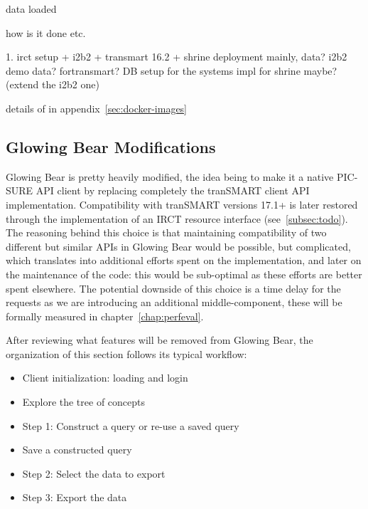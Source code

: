 data loaded

how is it done etc.

1. irct setup + i2b2 + transmart 16.2 + shrine
deployment mainly, data? i2b2 demo data? fortransmart? 
DB setup for the systems
impl for shrine maybe? (extend the i2b2 one)

details of in appendix~\ref{sec:docker-images}


\subsection{Glowing Bear Modifications}

Glowing Bear is pretty heavily modified, the idea being to make it a native PIC-SURE API client by replacing completely the tranSMART client API implementation. 
Compatibility with tranSMART versions 17.1+ is later restored through the implementation of an IRCT resource interface (see~\ref{subsec:todo}).
The reasoning behind this choice is that maintaining compatibility of two different but similar APIs in Glowing Bear would be possible, but complicated, which translates into additional efforts spent on the implementation, and later on the maintenance of the code: this would be sub-optimal as these efforts are better spent elsewhere.
The potential downside of this choice is a time delay for the requests as we are introducing an additional middle-component, these will be formally measured in chapter~\ref{chap:perfeval}.

After reviewing what features will be removed from Glowing Bear, the organization of this section follows its typical workflow:
\begin{itemize}
    \item Client initialization: loading and login
    \item Explore the tree of concepts
    \item Step 1: Construct a query or re-use a saved query
    \item Save a constructed query
    \item Step 2: Select the data to export
    \item Step 3: Export the data
\end{itemize}



